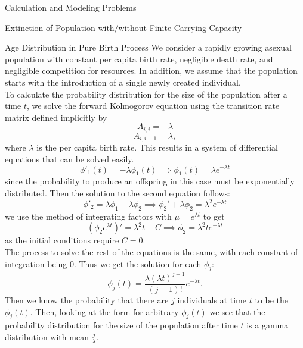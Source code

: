 \documentclass[12pt]{article}
\numberwithin{equation}{section}
\begin{document}
\begin{section}{Calculation and Modeling Problems}
\begin{subsection}{Extinction of Population with/without Finite Carrying Capacity}
    \end{subsection}
    \begin{subsection}{Age Distribution in Pure Birth Process}
    We consider a rapidly growing asexual population with constant per capita birth rate, negligible death rate, and negligible competition for resources. In addition, we assume that the population starts with the introduction of a single newly created individual.\\
     To calculate the probability distribution for the size of the population after a time $t$, we solve the forward Kolmogorov equation using the transition rate matrix defined implicitly by
        $$A_{i,i}=-\lambda$$
        $$A_{i,i+1}=\lambda,$$
        where $\lambda$ is the per capita birth rate. This results in a system of differential equations that can be solved easily.
        $$\phi'_1(t)=-\lambda\phi_1(t)\implies \phi_1(t)=\lambda e^{-\lambda t}$$
        since the probability to produce an offspring in this case must be exponentially distributed.
        Then the solution to the second equation follows:
        $$\phi'_2=\lambda\phi_1-\lambda\phi_2\implies \phi_2'+\lambda\phi_2=\lambda^2 e^{-\lambda t}$$
        we use the method of integrating factors with $\mu=e^{\lambda t}$ to get
        $$(\phi_2e^{\lambda t})'=\lambda^2 t+C\implies \phi_2=\lambda^2 te^{-\lambda t}$$
        as the initial conditions require $C=0$.\\
        The process to solve the rest of the equations is the same, with each constant of integration being 0. Thus we get the solution for each $\phi_j$:
        $$\phi_j(t)=\frac{\lambda(\lambda t)^{j-1}}{(j-1)!}e^{-\lambda t}.$$
        Then we know the probability that there are $j$ individuals at time $t$ to be the $\phi_j(t)$. Then, looking at the form for arbitrary $\phi_j(t)$ we see that the probability distribution for the size of the population after time $t$ is a gamma distribution with mean $\frac{j}{\lambda}$.
        \end{subsection}

\end{section}
\end{document}
